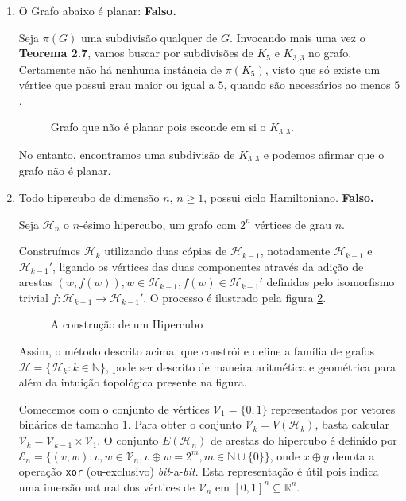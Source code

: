 \documentclass{homework}
\begin{document}
\begin{enumerate}[label=\textbf{\arabic*)}]
	\item O Grafo abaixo é planar: \textbf{Falso.} \par
	
	Seja $\pi(G)$ uma subdivisão qualquer de $G$. Invocando mais uma vez o \textbf{Teorema 2.7}\cite{jayme:18}, vamos buscar por subdivisões de $K_5$ e $K_{3, 3}$ no grafo. Certamente não há nenhuma instância de $\pi(K_5)$, visto que só existe um vértice que possui grau maior ou igual a $5$, quando são necessários ao menos $5$.
	
	\begin{figure}[H]
		\centering
		
		\caption{Grafo que não é planar pois esconde em si o $K_{3,3}$.}
		\label{fig:1.5.1}
	\end{figure}
	
	No entanto, encontramos uma subdivisão de $K_{3, 3}$ e podemos afirmar que o grafo não é planar.
	
	\item Todo hipercubo de dimensão $n$, $n \ge 1$, possui ciclo Hamiltoniano. \textbf{Falso.}
	
	Seja $\mathscr{H}_n$ o $n$-ésimo hipercubo, um grafo com $2^n$ vértices de grau $n$. \par
	
	Construímos $\mathscr{H}_k$ utilizando duas cópias de $\mathscr{H}_{k-1}$, notadamente $\mathscr{H}_{k-1}$ e $\mathscr{H}_{k-1}'$, ligando os vértices das duas componentes através da adição de arestas $(w, f(w)), w \in \mathscr{H}_{k-1}, f(w) \in \mathscr{H}_{k-1}'$ definidas pelo isomorfismo trivial $f:\mathscr{H}_{k-1}\to\mathscr{H}_{k-1}'$. O processo é ilustrado pela figura \ref{fig:1.6.1}. \par

	\begin{figure}[H]
		\centering
		
		\caption{A construção de um Hipercubo}
		\label{fig:1.6.1}
	\end{figure}

	Assim, o método descrito acima, que constrói e define a família de grafos $\mathscr{H} = \{\mathscr{H}_{k} : k \in \mathbb{N}\}$, pode ser descrito de maneira aritmética e geométrica para além da intuição topológica presente na figura.\par
	
	Comecemos com o conjunto de vértices $\mathscr{V}_1 = \{0, 1\}$ representados por vetores binários de tamanho $1$. Para obter o conjunto $\mathscr{V}_k = V(\mathscr{H}_k)$, basta calcular $\mathscr{V}_k = \mathscr{V}_{k-1} \times \mathscr{V}_1$. O conjunto $E(\mathscr{H}_n)$ de arestas do hipercubo é definido por $\mathscr{E}_n = \{(v, w) : v, w \in \mathscr{V}_n, v \oplus w = 2^{m}, m \in \mathbb{N} \cup \{0\}\}$, onde $x \oplus y$ denota a operação \texttt{xor} (ou-exclusivo) \textit{bit}-a-\textit{bit}. Esta representação é útil pois indica uma imersão natural dos vértices de $\mathscr{V}_n$ em $[0, 1]^{n} \subseteq\mathbb{R}^n$.\par


\end{enumerate}
\end{document}
